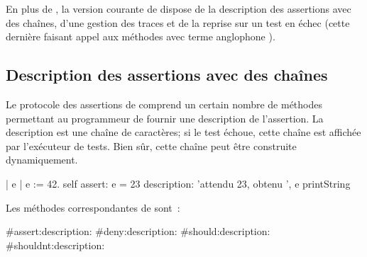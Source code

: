 \documentclass[a4paper,10pt,twoside]{book}
\begin{document}
En plus de , la version courante de \sunit dispose de la description des 
assertions avec des chaînes, d'une gestion des traces et de la reprise sur un test en échec 
(cette dernière faisant appel aux méthodes avec terme anglophone ).  

\subsection{Description des assertions avec des chaînes } %

Le protocole des assertions de  comprend un certain nombre de méthodes permettant 
au programmeur de fournir une description de l'assertion. La description est une chaîne de 
caractères; si le test échoue, cette chaîne est affichée par l'exécuteur de tests. Bien sûr, 
cette chaîne peut être construite dynamiquement.
\begin{code}{}
| e |
e := 42.
self assert: e = 23
	description: 'attendu 23, obtenu ', e printString
\end{code}

Les méthodes correspondantes  de  sont~:
\begin{code}{}
#assert:description:
#deny:description:
#should:description:
#shouldnt:description:
\end{code}
\end{document}
